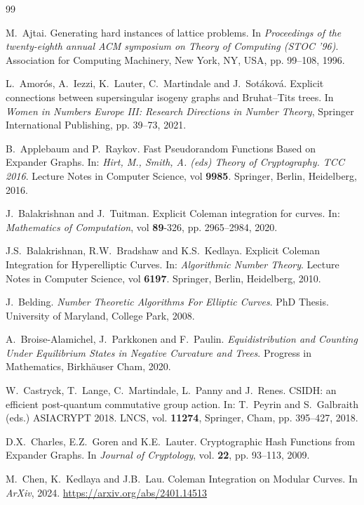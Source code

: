 \documentclass[10pt]{amsart}
\theoremstyle{theostyle}
\begin{document}
\newpage
\begin{thebibliography}{99}
	
M.~Ajtai. 
Generating hard instances of lattice problems. 
In {\it Proceedings of the twenty-eighth annual ACM symposium on Theory of Computing (STOC '96)}. Association for Computing Machinery, New York, NY, USA, pp. 99--108, 1996.

L.~Amor\'os, A.~Iezzi, K.~Lauter, C.~Martindale and J.~Sot\'akov\'a.
Explicit connections between supersingular isogeny graphs and Bruhat–Tits trees.
In {\it Women in Numbers Europe III: Research Directions in Number Theory}, Springer International Publishing, pp. 39--73, 2021.

B.~Applebaum and P.~Raykov. 
Fast Pseudorandom Functions Based on Expander Graphs. 
In: {\it Hirt, M., Smith, A. (eds) Theory of Cryptography. TCC 2016}. Lecture Notes in Computer Science, vol {\bf 9985}. Springer, Berlin, Heidelberg, 2016.

J.~Balakrishnan and J.~Tuitman. 
Explicit Coleman integration for curves. 
In: {\it Mathematics of Computation}, vol {\bf 89}-326, pp. 2965--2984, 2020.

J.S.~Balakrishnan, R.W.~Bradshaw and K.S.~Kedlaya. 
Explicit Coleman Integration for Hyperelliptic Curves. 
In: {\it Algorithmic Number Theory}. Lecture Notes in Computer Science, vol {\bf 6197}. Springer, Berlin, Heidelberg, 2010.

J.~Belding. 
{\it Number Theoretic Algorithms For Elliptic Curves}.
PhD Thesis. University of Maryland, College Park, 2008.

A.~Broise-Alamichel, J.~Parkkonen and F.~Paulin.
{\it Equidistribution and Counting Under Equilibrium States in Negative Curvature and Trees}.
Progress in Mathematics, Birkh\"{a}user Cham, 2020.

W.~Castryck, T.~Lange, C.~Martindale, L.~Panny and J.~Renes. 
CSIDH: an efficient post-quantum commutative group action. 
In: {T.~Peyrin and S.~Galbraith (eds.) ASIACRYPT 2018. LNCS}, vol. {\bf 11274}, Springer, Cham, pp. 395--427, 2018.

D.X.~Charles, E.Z.~Goren and K.E.~Lauter.
Cryptographic Hash Functions from Expander Graphs. 
In {\it Journal of Cryptology}, vol. {\bf 22}, pp. 93--113, 2009.

M.~Chen, K.~Kedlaya and J.B.~Lau.
Coleman Integration on Modular Curves.
In {\it ArXiv}, 2024.
\url{https://arxiv.org/abs/2401.14513}


\end{thebibliography}
\end{document}
